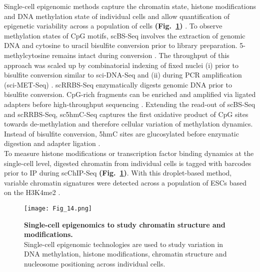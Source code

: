 Single-cell epigenomic methods capture the chromatin state, histone modifications and DNA methylation state of individual cells and allow quantification of epigenetic variability across a population of cells \textbf{(Fig.~\ref{fig0:scEpigenomics})} \citep{Clark2016}. To observe methylation states of CpG motifs, \gls{scBS-Seq} involves the extraction of genomic DNA and cytosine to uracil bisulfite conversion prior to library preparation. 5-methylcytosine remains intact during conversion \citep{Smallwood2014, Farlik2015}. The throughput of this approach was scaled up by combinatorial indexing of fixed nuclei (i) prior to bisulfite conversion similar to sci-DNA-Seq and (ii) during PCR amplification (sci-MET-Seq) \citep{Basque2017}. \Gls{scRRBS-Seq} enzymatically digests genomic DNA prior to bisulfite conversion. CpG-rich fragments can be enriched and amplified via ligated adapters before high-throughput sequencing \citep{Guo2013}. Extending the read-out of scBS-Seq and scRRBS-Seq, \gls{sc5hmC-Seq} captures the first oxidative product of CpG sites towards de-methylation and therefore cellular variation of methylation dynamics. Instead of bisulfite conversion, 5hmC sites are glucosylated before enzymatic digestion and adapter ligation \citep{Mooijman2016}. \\

To measure histone modifications or transcription factor binding dynamics at the single-cell level, digested chromatin from individual cells is tagged with barcodes prior to \gls{IP} during \gls{scChIP-Seq} \textbf{(Fig.~\ref{fig0:scEpigenomics})}. With this droplet-based method, variable chromatin signatures were detected across a population of ESCs based on the \gls{H3K4me2} \citep{Rotem2015}. 

\begin{figure}[!h]
\centering
\texttt{[image: Fig\_14.png]}
\caption[Single-cell epigenomics to study chromatin structure and modifications]{\textbf{Single-cell epigenomics to study chromatin structure and modifications.}\\
Single-cell epigenomic technologies are used to study variation in DNA methylation, histone modifications, chromatin structure and nucleosome positioning across individual cells.}
\label{fig0:scEpigenomics}
\end{figure}

